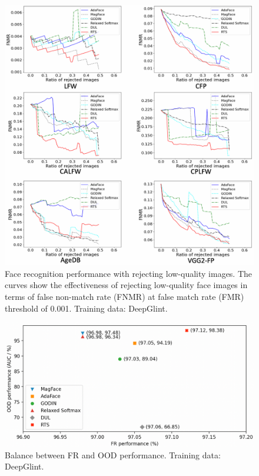 \documentclass[letterpaper]{article} %
\begin{document}
\begin{figure}[t]
    \centering
    \includegraphics[width=0.8\linewidth]{figures/rej_fr_curve_adaface_large_all_legend.png}
    \caption{Face recognition performance with rejecting low-quality images. The curves show the effectiveness of rejecting low-quality face images in terms of false non-match rate (FNMR) at false match rate (FMR) threshold of 0.001. Training data: DeepGlint.}
    \label{fig:rej_fr_curve}
\end{figure}


\begin{figure}[t]
\centering
  \includegraphics[width=0.72\linewidth]{figures/FR-OOD_small2.png}
  \caption{Balance between FR and OOD performance. Training data: DeepGlint.}
\label{fig:FR-OOD}
\end{figure}



\end{document}
